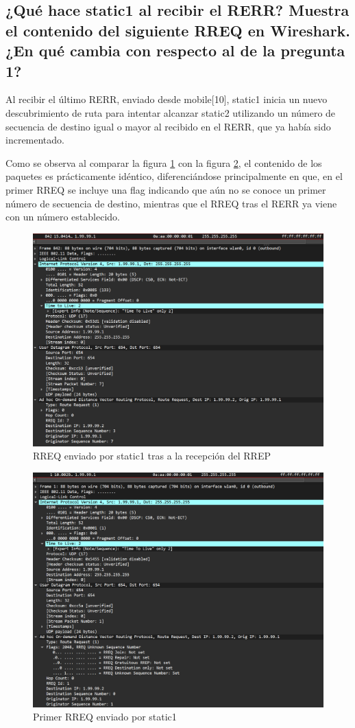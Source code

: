 \subsection{¿Qué hace static1 al recibir el RERR? Muestra el contenido del siguiente RREQ en Wireshark. ¿En qué cambia
con respecto al de la pregunta 1?}

Al recibir el último RERR, enviado desde mobile[10], static1 inicia un nuevo descubrimiento de ruta para intentar alcanzar static2 utilizando un número de secuencia de destino igual o mayor al recibido en el RERR, que ya había sido incrementado.

Como se observa al comparar la figura \ref{fig:RREQstatic1} con la figura \ref{fig:PrimerRREQstatic1}, el contenido de los paquetes es prácticamente idéntico, diferenciándose principalmente en que, en el primer RREQ se incluye una flag indicando que aún no se conoce un primer número de secuencia de destino, mientras que el RREQ tras el RERR ya viene con un número establecido.

\begin{figure}[H]
    \centering
    \includegraphics[width=125mm, scale=0.75]{imaxes/aodv/ejercicio8_1.png}
    \caption{RREQ enviado por static1 tras a la recepción del RREP}
    \label{fig:RREQstatic1}
\end{figure}

\begin{figure}[H]
    \centering
    \includegraphics[width=125mm, scale=0.75]{imaxes/aodv/ejercicio8_2.png}
    \caption{Primer RREQ enviado por static1}
    \label{fig:PrimerRREQstatic1}
\end{figure}
